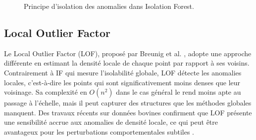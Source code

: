 \begin{figure}[H]
    \centering
    \caption{Principe d'isolation des anomalies dans Isolation Forest.}
    \label{fig:if_principle}
\end{figure}

\subsection{Local Outlier Factor}
Le Local Outlier Factor (LOF), proposé par Breunig et al. \citep{breunig2000lof}, adopte
une approche différente en estimant la densité locale de chaque point par rapport à ses
voisins. Contrairement à IF qui mesure l'isolabilité globale, LOF détecte les anomalies
locales, c'est-à-dire les points qui sont significativement moins denses que leur voisinage.
Sa complexité en $O(n^2)$ dans le cas général le rend moins apte au passage à l'échelle,
mais il peut capturer des structures que les méthodes globales manquent. Des travaux récents sur données bovines
confirment que LOF présente une sensibilité accrue aux anomalies de densité locale, ce qui
peut être avantageux pour les perturbations comportementales subtiles
\citep{michelena2025comparative}.

